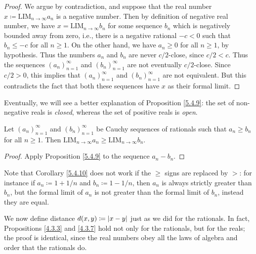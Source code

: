 \begin{proof}
    We argue by contradiction, and suppose that the real number \(x \coloneqq \text{LIM}_{n \to \infty} a_n\) is a negative number.
    Then by definition of negative real number, we have \(x = \text{LIM}_{n \to \infty} b_n\) for some sequence \(b_n\) which is negatively bounded away from zero, i.e., there is a negative rational \(-c < 0\) such that \(b_n \leq -c\) for all \(n \geq 1\).
    On the other hand, we have \(a_n \geq 0\) for all \(n \geq 1\), by hypothesis.
    Thus the numbers \(a_n\) and \(b_n\) are never \(c / 2\)-close, since \(c / 2 < c\).
    Thus the sequences \((a_n)_{n = 1}^{\infty}\) and \((b_n)_{n = 1}^{\infty}\) are not eventually \(c / 2\)-close.
    Since \(c / 2 > 0\), this implies that \((a_n)_{n = 1}^{\infty}\) and \((b_n)_{n = 1}^{\infty}\) are not equivalent.
    But this contradicts the fact that both these sequences have \(x\) as their formal limit.
\end{proof}

\begin{note}
    Eventually, we will see a better explanation of Proposition \ref{5.4.9}:
    the set of non-negative reals is \emph{closed}, whereas the set of positive reals is \emph{open}.
\end{note}

\begin{corollary}\label{5.4.10}
    Let \((a_n)_{n = 1}^{\infty}\) and \((b_n)_{n = 1}^{\infty}\) be Cauchy sequences of rationals such that \(a_n \geq b_n\) for all \(n \geq 1\).
    Then \(\text{LIM}_{n \to \infty} a_n \geq \text{LIM}_{n \to \infty} b_n\).
\end{corollary}

\begin{proof}
    Apply Proposition \ref{5.4.9} to the sequence \(a_n - b_n\).
\end{proof}

\begin{remark}\label{5.4.11}
    Note that Corollary \ref{5.4.10} does not work if the \(\geq\) signs are replaced by \(>\):
    for instance if \(a_n \coloneqq 1 + 1 / n\) and \(b_n \coloneqq 1 - 1 / n\), then \(a_n\) is always strictly greater than \(b_n\), but the formal limit of \(a_n\) is not greater than the formal limit of \(b_n\), instead they are equal.
\end{remark}

\begin{note}
    We now define distance \(d(x, y) \coloneqq \abs*{x - y}\) just as we did for the rationals.
    In fact, Propositions \ref{4.3.3} and \ref{4.3.7} hold not only for the rationals, but for the reals;
    the proof is identical, since the real numbers obey all the laws of algebra and order that the rationals do.
\end{note}

